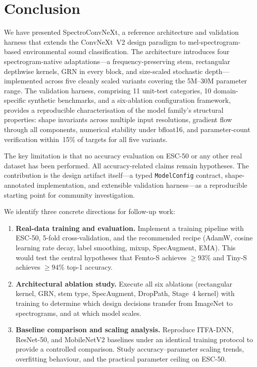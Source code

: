 \documentclass{article}
\begin{document}
\section{Conclusion}

We have presented SpectroConvNeXt, a reference architecture and validation
harness that extends the ConvNeXt~V2 design paradigm to mel-spectrogram-based
environmental sound classification. The architecture introduces four
spectrogram-native adaptations---a frequency-preserving stem, rectangular
depthwise kernels, GRN in every block, and size-scaled stochastic
depth---implemented across five cleanly scaled variants covering the 5M--30M
parameter range. The validation harness, comprising 11 unit-test categories,
10 domain-specific synthetic benchmarks, and a six-ablation configuration
framework, provides a reproducible characterisation of the model family's
structural properties: shape invariants across multiple input resolutions,
gradient flow through all components, numerical stability under bfloat16, and
parameter-count verification within~15\% of targets for all five variants.

The key limitation is that no accuracy evaluation on ESC-50 or any other
real dataset has been performed. All accuracy-related claims remain hypotheses.
The contribution is the design artifact itself---a typed \texttt{ModelConfig}
contract, shape-annotated implementation, and extensible validation harness---as
a reproducible starting point for community investigation.

We identify three concrete directions for follow-up work:

\begin{enumerate}
  \item \textbf{Real-data training and evaluation.} Implement a training
  pipeline with ESC-50, 5-fold cross-validation, and the recommended recipe
  (AdamW, cosine learning rate decay, label smoothing, mixup, SpecAugment, EMA).
  This would test the central hypotheses that Femto-S achieves $\geq 93\%$ and
  Tiny-S achieves $\geq 94\%$ top-1 accuracy.
  \item \textbf{Architectural ablation study.} Execute all six ablations
  (rectangular kernel, GRN, stem type, SpecAugment, DropPath, Stage~4 kernel)
  with training to determine which design decisions transfer from ImageNet to
  spectrograms, and at which model scales.
  \item \textbf{Baseline comparison and scaling analysis.} Reproduce ITFA-DNN,
  ResNet-50, and MobileNetV2 baselines under an identical training protocol to
  provide a controlled comparison. Study accuracy--parameter scaling trends,
  overfitting behaviour, and the practical parameter ceiling on ESC-50.
\end{enumerate}
\end{document}
